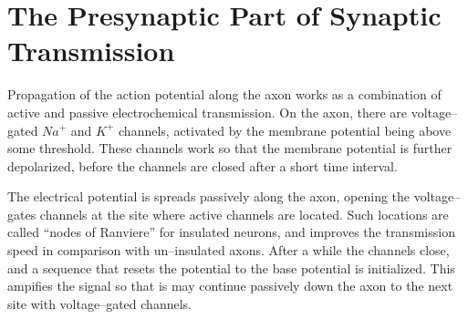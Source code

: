 \section{The Presynaptic Part of Synaptic Transmission}
\label{appendixSynapticPlasticity:presynapticMechanisms}%
Propagation of the action potential along the axon works as a combination of active and passive electrochemical transmission.
On the axon, there are voltage--gated $Na^+$ and $K^+$ channels, activated by the membrane potential being above some threshold.
These channels work so that the membrane potential is further depolarized, before the channels are closed after a short time interval.

The electrical potential is spreads passively along the axon, opening the voltage--gates channels at the site where active channels are located.
Such locations are called ``nodes of Ranviere'' for insulated neurons, and improves the transmission speed in comparison with un--insulated axons.
After a while the channels close, and a sequence that resets the potential to the base potential is initialized. %
This ampifies the signal so that is may continue passively down the axon to the next site with voltage--gated channels\cite{PrinciplesOfNeuralScience4edKAP09}. 
 


